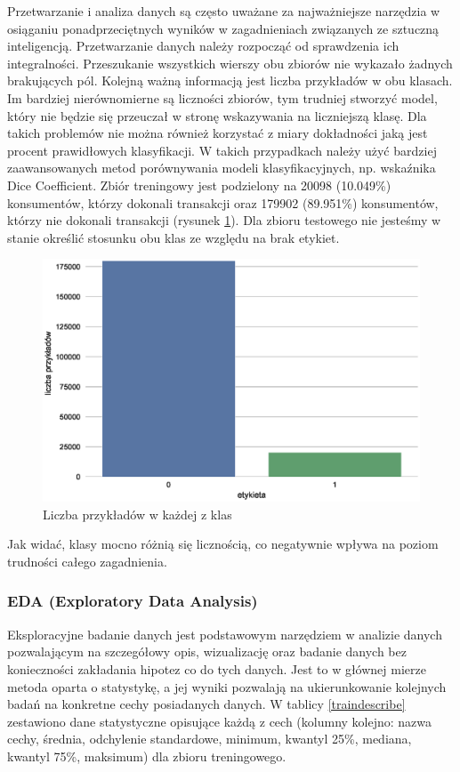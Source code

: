 \documentclass[12pt]{article}
\begin{document}
Przetwarzanie i analiza danych są często uważane za najważniejsze narzędzia w osiąganiu ponadprzeciętnych wyników w zagadnieniach związanych ze sztuczną inteligencją. Przetwarzanie danych należy rozpocząć od sprawdzenia ich integralności. Przeszukanie wszystkich wierszy obu zbiorów nie wykazało żadnych brakujących pól. Kolejną ważną informacją jest liczba przykładów w obu klasach. Im bardziej nierównomierne są liczności zbiorów, tym trudniej stworzyć model, który nie będzie się przeuczał w stronę wskazywania na liczniejszą klasę. Dla takich problemów nie można również korzystać z miary dokładności jaką jest procent prawidłowych klasyfikacji. W takich przypadkach należy użyć bardziej zaawansowanych metod porównywania modeli klasyfikacyjnych, np. wskaźnika Dice Coefficient. Zbiór treningowy jest podzielony na 20098 (10.049\%) konsumentów, którzy dokonali transakcji oraz 179902 (89.951\%) konsumentów, którzy nie dokonali transakcji (rysunek \ref{classescount}). Dla zbioru testowego nie jesteśmy w stanie określić stosunku obu klas ze względu na brak etykiet. 
\begin{figure}[H]
\centering \includegraphics[scale=0.7]{classes.eps}
\caption{Liczba przykładów w każdej z klas}
\label{classescount}
\end{figure}
Jak widać, klasy mocno różnią się licznością, co negatywnie wpływa na poziom trudności całego zagadnienia.

\subsubsection{EDA (Exploratory Data Analysis)}

Eksploracyjne badanie danych jest podstawowym narzędziem w analizie danych pozwalającym na szczegółowy opis, wizualizację oraz badanie danych bez konieczności zakładania hipotez co do tych danych. Jest to w głównej mierze metoda oparta o statystykę, a jej wyniki pozwalają na ukierunkowanie kolejnych badań na konkretne cechy posiadanych danych. 
\newline W tablicy \ref{traindescribe} zestawiono dane statystyczne opisujące każdą z cech (kolumny kolejno: nazwa cechy, średnia, odchylenie standardowe, minimum, kwantyl 25\%, mediana, kwantyl 75\%, maksimum) dla zbioru treningowego.
\end{document}
